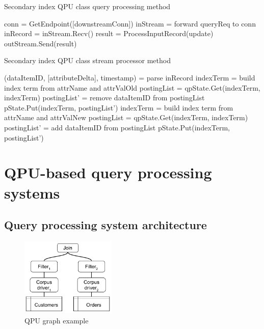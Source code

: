\begin{algorithm}
\caption{Secondary index QPU class query processing method}
\label{algo:index_query_processing_func}
\begin{algorithmic}
\State conn = GetEndpoint([downstreamConn]) 
\State inStream = forward queryReq to conn
\State inRecord = inStream.Recv()
\State result = ProcessInputRecord(update)
\State outStream.Send(result)
\EndIf
\EndWhile
\EndFunction
\end{algorithmic}
\end{algorithm}

\begin{algorithm}
\caption{Secondary index QPU class stream processor method}
\label{algo:index_callback_func}
\begin{algorithmic}
\State (dataItemID, [attributeDelta], timestamp) = parse inRecord
\State indexTerm = build index term from attrName and attrValOld
\State postingList = qpState.Get(indexTerm, indexTerm)
\State postingList' = remove dataItemID from postingList
\State pState.Put(indexTerm, postingList')
\EndIf
{}
\State indexTerm = build index term from attrName and attrValNew
\State postingList = qpState.Get(indexTerm, indexTerm)
\State postingList' = add dataItemID from postingList
\State pState.Put(indexTerm, postingList')
\EndIf
\EndFor
\EndFunction
\end{algorithmic}
\end{algorithm}


\section{QPU-based query processing systems}
\label{sec:query_processing_system}

\subsection{Query processing system architecture}

\begin{figure}[t]
  \centering
    \includegraphics[width=0.4\textwidth]{./figures/design_pattern/qpu_graph_emergent_properties.pdf}
  \caption{QPU graph example}
  \label{fig:qpu_graph_emergent_properties}
\end{figure}


